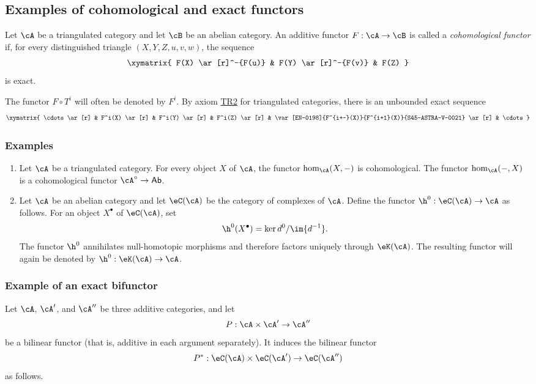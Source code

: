 \subsection{Examples of cohomological and exact functors}\label{VIII:1-3}

\begin{definition}
Let $\cA$ be a triangulated category and let $\cB$ be an abelian category.
An additive functor $F:\cA\to \cB$ is called a \emph{cohomological
functor} if, for every distinguished triangle $(X,Y,Z,u,v,w)$, the
sequence
\[\xymatrix{
  F(X) \ar[r]^-{F(u)}
    & F(Y) \ar[r]^-{F(v)}
    & F(Z)
}\]
is exact.
\end{definition}

The functor $F\circ T^i$ will often be denoted by $F^i$. By axiom
\hyperlink{VIII:TR2}{TR2} for triangulated categories, there is an
unbounded exact sequence
\[\xymatrix{
  \cdots \ar[r]
    & F^i(X) \ar[r]
    & F^i(Y) \ar[r]
    & F^i(Z) \ar[r]
    & \var[EN-0198]{F^{i+-}(X)}{F^{i+1}(X)}{S45-ASTRA-V-0021} \ar[r]
    & \cdots
}\]

\subsubsection{Examples}\label{VIII:1-3-2}

\begin{enumerate}
  \item Let $\cA$ be a triangulated category. For every object $X$ of
    $\cA$, the functor $\hom_\cA(X,-)$ is cohomological. The functor
    $\hom_\cA(-,X)$ is a cohomological functor
    $\cA^\circ\to\mathsf{Ab}$.
  \item Let $\cA$ be an abelian category and let $\eC(\cA)$ be the category
    of complexes of $\cA$. Define the functor
    $\h^0:\eC(\cA)\to\cA$ as follows. For an object $X^\bullet$ of
    $\eC(\cA)$, set
    \[
      \h^0(X^\bullet) = \ker d^0 / \im{d^{-1}} \text{.}
    \]
    The functor $\h^0$ annihilates null-homotopic morphisms and therefore
    factors uniquely through $\eK(\cA)$. The resulting functor will again
    be denoted by $\h^0:\eK(\cA) \to \cA$.
\end{enumerate}

\subsubsection{Example of an exact bifunctor}\label{VIII:1-3-3}

Let $\cA$, $\cA'$, and $\cA''$ be three additive categories, and let
\[
  P:\cA\times \cA'\to \cA''
\]
be a bilinear functor (that is, additive in each argument separately).
It induces the bilinear functor
\[
  P^\ast:\eC(\cA)\times \eC(\cA') \to \eC(\cA'')
\]
as follows.

